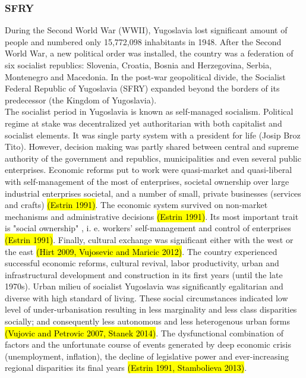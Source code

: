 \documentclass[11pt]{report}
\begin{document}
\subsubsection{SFRY}
During the Second World War (WWII), Yugoslavia lost significant amount of people and numbered only 15,772,098 inhabitants in 1948. After the Second World War, a new political order was installed, the country was a federation of six socialist republics: Slovenia, Croatia, Bosnia and Herzegovina, Serbia, Montenegro and Macedonia. In the post-war geopolitical divide, the Socialist Federal Republic of Yugoslavia (SFRY) expanded beyond the borders of its predecessor (the Kingdom of Yugoslavia).
\\
The socialist period in Yugoslavia is known as self-managed socialism\footnotemark. Political regime at stake was decentralized yet authoritarian with both capitalist and socialist elements. It was single party system with a president for life (Josip Broz Tito). However, decision making was partly shared between central and supreme authority of the government and republics, municipalities and even several public enterprises. Economic reforms put to work were quasi-market and quasi-liberal with self-management of the most of enterprises, societal ownership over large industrial enterprises societal, and a number of small, private businesses (services and crafts) \hl{(Estrin 1991)}. The economic system survived on non-market mechanisms and administrative decisions \hl{(Estrin 1991)}. Its most important trait is "social  ownership" , i. e.  workers' self-management and control of  enterprises \hl{(Estrin 1991)}. Finally, cultural exchange was significant either with the west or the east \hl{(Hirt 2009, Vujosevic and Maricic 2012)}. The country experienced successful economic reforms, cultural revival, labor productivity, urban and infrastructural development and construction in its first years (until the late 1970s). Urban milieu of socialist Yugoslavia was significantly egalitarian and diverse with high standard of living. These social circumstances indicated low level of under-urbanisation resulting in less marginality and less class disparities socially; and consequently less autonomous and less heterogenous urban forms \hl{(Vujovic and Petrovic 2007, Stanek 2014)}. The dysfunctional combination of factors and the unfortunate course of events generated by deep economic crisis (unemployment, inflation), the decline of legislative power and ever-increasing regional disparities its final years \hl{(Estrin 1991, Stambolieva 2013)}.
\end{document}
